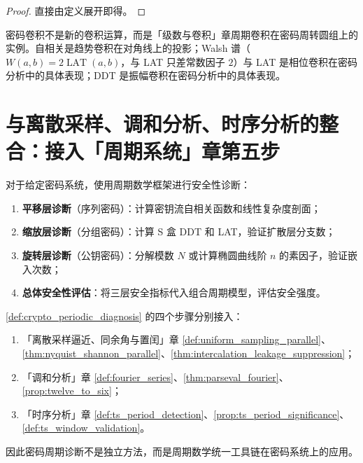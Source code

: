 \begin{proof}
直接由定义展开即得。
\end{proof}

\begin{remark}[密码卷积与周期卷积的关系]\label{rem:crypto_convolution_relation}
密码卷积不是新的卷积运算，而是「级数与卷积」章周期卷积在密码周转圆组上的实例。自相关是趋势卷积在对角线上的投影；Walsh 谱（$W(a,b)=2\operatorname{LAT}(a,b)$，与 LAT 只差常数因子 $2$）与 LAT 是相位卷积在密码分析中的具体表现；DDT 是振幅卷积在密码分析中的具体表现。
\end{remark}

\section{与离散采样、调和分析、时序分析的整合：接入「周期系统」章第五步}
\label{sec:crypto_integration}

\begin{definition}[密码周期诊断流程]\label{def:crypto_periodic_diagnosis}
对于给定密码系统，使用周期数学框架进行安全性诊断：
\begin{enumerate}[label=(\roman*)]
    \item \textbf{平移层诊断}（序列密码）：计算密钥流自相关函数和线性复杂度剖面；
    \item \textbf{缩放层诊断}（分组密码）：计算 S 盒 DDT 和 LAT，验证扩散层分支数；
    \item \textbf{旋转层诊断}（公钥密码）：分解模数 \(N\) 或计算椭圆曲线阶 \(n\) 的素因子，验证嵌入次数；
    \item \textbf{总体安全性评估}：将三层安全指标代入组合周期模型，评估安全强度。
\end{enumerate}
\end{definition}

\begin{theorem}[密码周期诊断流程与三章接口]\label{thm:crypto_diagnosis_integration}
\cref{def:crypto_periodic_diagnosis} 的四个步骤分别接入：
\begin{enumerate}[label=(\roman*)]
    \item 「离散采样逼近、同余角与置闰」章 \cref{def:uniform_sampling_parallel}、\cref{thm:nyquist_shannon_parallel}、\cref{thm:intercalation_leakage_suppression}；
    \item 「调和分析」章 \cref{def:fourier_series}、\cref{thm:parseval_fourier}、\cref{prop:twelve_to_six}；
    \item 「时序分析」章 \cref{def:ts_period_detection}、\cref{prop:ts_period_significance}、\cref{def:ts_window_validation}。
\end{enumerate}
因此密码周期诊断不是独立方法，而是周期数学统一工具链在密码系统上的应用。
\end{theorem}

